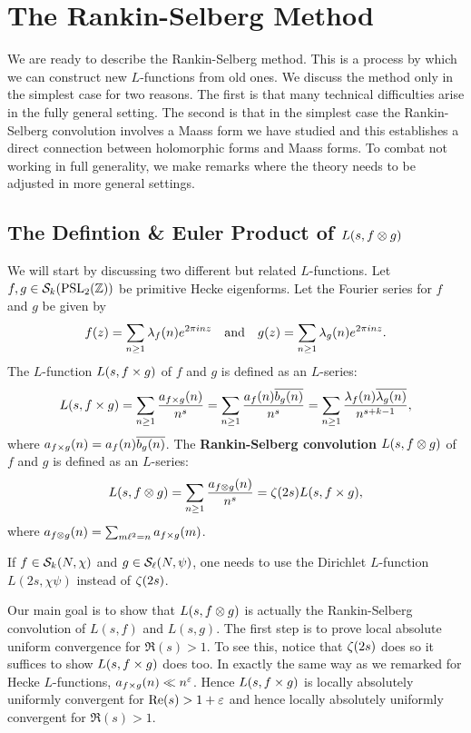   \section{The Rankin-Selberg Method}\label{sec:The_Rankin-Selberg_Method}
    We are ready to describe the Rankin-Selberg method. This is a process by which we can construct new $L$-functions from old ones. We discuss the method only in the simplest case for two reasons. The first is that many technical difficulties arise in the fully general setting. The second is that in the simplest case the Rankin-Selberg convolution involves a Maass form we have studied and this establishes a direct connection between holomorphic forms and Maass forms. To combat not working in full generality, we make remarks where the theory needs to be adjusted in more general settings.
    \subsection*{The Defintion \& Euler Product of \texorpdfstring{$L(s,f \otimes g)$}{L(s,f \ox g)}}
      We will start by discussing two different but related $L$-functions. Let $f,g \in \mathcal{S}_{k}(\mathrm{PSL}_{2}(\mathbb{Z}))$ be primitive Hecke eigenforms. Let the Fourier series for $f$ and $g$ be given by
      \[
        f(z) = \sum_{n \ge 1}\lambda_{f}(n)e^{2\pi inz} \quad \text{and} \quad g(z) = \sum_{n \ge 1}\lambda_{g}(n)e^{2\pi inz}.
      \]
      The $L$-function $L(s,f \times g)$ of $f$ and $g$ is defined as an $L$-series:
      \[
        L(s,f \times g) = \sum_{n \ge 1}\frac{a_{f \times g}(n)}{n^{s}} = \sum_{n \ge 1}\frac{a_{f}(n)\overline{b_{g}(n)}}{n^{s}} = \sum_{n \ge 1}\frac{\lambda_{f}(n)\overline{\lambda_{g}(n)}}{n^{s+k-1}},
      \]
      where $a_{f \times g}(n) = a_{f}(n)\overline{b_{g}(n)}$. The \textbf{Rankin-Selberg convolution} $L(s,f \otimes g)$ of $f$ and $g$ is defined as an $L$-series:
      \[
        L(s,f \otimes g) = \sum_{n \ge 1}\frac{a_{f \otimes g}(n)}{n^{s}} = \zeta(2s)L(s,f \times g),
      \]
      where $a_{f \otimes g}(n) = \sum_{m\ell^{2} = n}a_{f \times g}(m)$.

      \begin{remark}
        If $f \in \mathcal{S}_{k}(N,\chi)$ and $g \in \mathcal{S}_{\ell}(N,\psi)$, one needs to use the Dirichlet $L$-function $L(2s,\chi\psi)$ instead of $\zeta(2s)$.
      \end{remark}

      Our main goal is to show that $L(s,f \otimes g)$ is actually the Rankin-Selberg convolution of $L(s,f)$ and $L(s,g)$. The first step is to prove local absolute uniform convergence for $\Re(s) > 1$. To see this, notice that $\zeta(2s)$ does so it suffices to show $L(s,f \times g)$ does too. In exactly the same way as we remarked for Hecke $L$-functions, $a_{f \times g}(n) \ll n^{\varepsilon}$. Hence $L(s,f \times g)$ is locally absolutely uniformly convergent for $\mathrm{Re}(s) > 1+\varepsilon$ and hence locally absolutely uniformly convergent for $\Re(s) > 1$.
      
